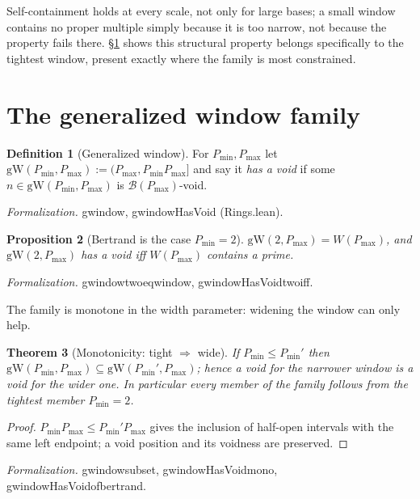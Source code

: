 \documentclass[11pt,a4paper]{amsart}
\theoremstyle{plain}
\newtheorem{theorem}{Theorem}[section]
\newtheorem{proposition}[theorem]{Proposition}
\theoremstyle{definition}
\newtheorem{definition}[theorem]{Definition}
\theoremstyle{plain}
\theoremstyle{remark}
\newcommand{\lean}[1]{\begingroup\upshape\ttfamily\def\_{\textunderscore\allowbreak}#1\endgroup}
\newcommand{\Formal}[1]{\par\smallskip\noindent\begingroup\raggedright\emph{Formalization.} #1\par\endgroup\smallskip}
\begin{document}
Self-containment holds at every scale, not only for large bases; a small window contains
no proper multiple simply because it is too narrow, not because the property fails there.
\S\ref{sec:family} shows this structural property belongs specifically to the tightest
window, present exactly where the family is most constrained.

\section{The generalized window family}
\label{sec:family}

\begin{definition}[Generalized window]
For $P_{\min},P_{\max}$ let $\mathrm{gW}(P_{\min},P_{\max}):=(P_{\max},P_{\min}P_{\max}]$
and say it \emph{has a void} if some $n\in\mathrm{gW}(P_{\min},P_{\max})$ is
$\mathcal{B}(P_{\max})$-void.
\end{definition}

\Formal{\lean{gwindow}, \lean{gwindowHasVoid} (\lean{Rings.lean}).}

\begin{proposition}[Bertrand is the case $P_{\min}=2$]\label{prop:two}
$\mathrm{gW}(2,P_{\max})=W(P_{\max})$, and $\mathrm{gW}(2,P_{\max})$ has a void iff
$W(P_{\max})$ contains a prime.
\end{proposition}

\Formal{\lean{gwindow\_two\_eq\_window}, \lean{gwindowHasVoid\_two\_iff}.}

The family is monotone in the width parameter: widening the window can only help.

\begin{theorem}[Monotonicity: tight $\Rightarrow$ wide]\label{thm:mono}
If $P_{\min}\le P_{\min}'$ then $\mathrm{gW}(P_{\min},P_{\max})\subseteq
\mathrm{gW}(P_{\min}',P_{\max})$; hence a void for the narrower window is a void for the
wider one. In particular every member of the family follows from the tightest member
$P_{\min}=2$.
\end{theorem}

\begin{proof}
$P_{\min}P_{\max}\le P_{\min}'P_{\max}$ gives the inclusion of half-open intervals with the
same left endpoint; a void position and its voidness are preserved.
\end{proof}

\Formal{\lean{gwindow\_subset}, \lean{gwindowHasVoid\_mono},
\lean{gwindowHasVoid\_of\_bertrand}.}
\end{document}
